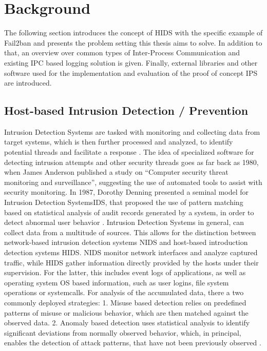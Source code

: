 %
%

\chapter{Background}
\label{sec:background}

The following section introduces the concept of \ac{HIDS} with the specific example of Fail2ban and presents the problem setting 
this thesis aims to solve. In addition to that, an overview over common types of Inter-Process Communication and existing IPC based logging solution is given. 
Finally, external libraries and other software used for the implementation and evaluation of the proof of concept IPS are introduced.    

\section{Host-based Intrusion Detection / Prevention}
\label{sec:hids}
Intrusion Detection Systems are tasked with monitoring and collecting data from target systems, which is then further processed and analyzed, to identify 
potential threads and facilitate a response \cite{vigna2006}.
The idea of specialized software for detecting intrusion attempts and other 
security threads goes as far back as 1980, when James Anderson published a study on 
``Computer security threat monitoring and surveillance'', suggesting the use of automated tools to assist with security monitoring\cite{anderson1980}. In 1987, Dorothy
Denning presented a seminal model for Intrusion Detection Systems\ac{IDS}, that proposed the use of pattern matching based on
statistical analysis of audit records generated by a system, in order to detect abnormal user behavior \cite{denning1987}. 
Intrusion Detection Systems in general, can collect data from a multitude of sources. This allows for the distinction between network-based intrusion detection systems \ac{NIDS} and host-based introduction detection systems \ac{HIDS}. \ac{NIDS}
monitor network interfaces and analyze captured traffic, while \ac{HIDS} gather information directly provided by the hosts under their supervision. For the latter, this includes event logs of applications, as well as operating system \ac{OS} based information,
such as user logins, file system operations or systemcalls. For analysis of the accumulated data, there a two commonly deployed strategies: 1. Misuse based detection relies on predefined 
patterns of misuse or malicious behavior, which are then matched against the observed data. 2. Anomaly based detection uses statistical analysis to identify significant deviations
from normally observed behavior, which, in principal, enables the detection of attack patterns, that have not been previously observed \cite{vigna2006}. 

